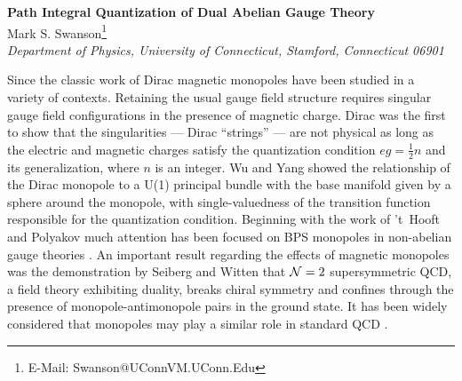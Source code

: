\documentclass[a4paper,a4paper]{article}
\begin{document}
\large

\begin{center} {\Large \bf Path Integral Quantization of Dual Abelian Gauge Theory} \\
\vspace{2ex}
Mark S. Swanson\footnote{E-Mail: Swanson@UConnVM.UConn.Edu} \\

{\it Department of Physics, University of Connecticut, Stamford, Connecticut 06901}
\end{center}

\begin{abstract}
The path integral for 3+1 abelian gauge theory is rewritten in terms of a real antisymmetric field allowing a dual action that couples the electric and magnetic currents to the photon and each other in a gauge invariant manner.  Standard perturbative abelian quantum electrodynamics reemerges when the monopole current vanishes. For certain simple relationships between the monopole current and the electric current, the altered photon propagator can exhibit abelian charge confinement or develop mass, modeling effects believed to be present in non-abelian theories. 
\end{abstract}

\vspace{3ex}

Since the classic work of Dirac \cite{Dirac} magnetic monopoles have been studied in a variety of contexts.  Retaining the usual gauge field structure requires singular gauge field configurations in the presence of magnetic charge.  Dirac was the first to show that the singularities --- Dirac ``strings'' --- are not physical as long as the electric and magnetic charges satisfy the quantization condition $eg = \frac{1}{2} n$ and its generalization, where $n$ is an integer.  Wu and Yang \cite{WuYang} showed the relationship of the Dirac monopole to a U(1) principal bundle with the base manifold given by a sphere around the monopole, with single-valuedness of the transition function responsible for the quantization condition.  Beginning with the work of 't~Hooft and Polyakov \cite{tHooftPolyakov} much attention has been focused on BPS monopoles in non-abelian gauge theories \cite{Harvey}.  An important result regarding the effects of magnetic monopoles was the demonstration by Seiberg and Witten \cite{SeibergWitten} that ${\cal N} =2$ supersymmetric QCD, a field theory exhibiting duality, breaks chiral symmetry and confines through the presence of monopole-antimonopole pairs in the ground state. It has been widely considered that monopoles may play a similar role in standard QCD \cite{tHooftBruckmann}.
\end{document}
